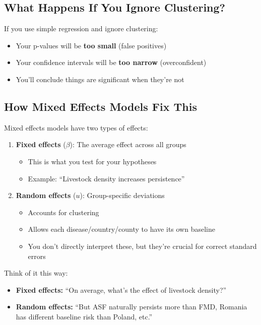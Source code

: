 \documentclass[11pt,a4paper]{article}
\begin{document}
\subsection{What Happens If You Ignore Clustering?}

\begin{warning}
If you use simple regression and ignore clustering:
\begin{itemize}
    \item Your p-values will be \textbf{too small} (false positives)
    \item Your confidence intervals will be \textbf{too narrow} (overconfident)
    \item You'll conclude things are significant when they're not
  
\end{itemize}
\end{warning}

\subsection{How Mixed Effects Models Fix This}

Mixed effects models have two types of effects:

\begin{enumerate}
    \item \textbf{Fixed effects} ($\beta$): The average effect across all groups
        \begin{itemize}
            \item This is what you test for your hypotheses
            \item Example: ``Livestock density increases persistence''
        \end{itemize}
    
    \item \textbf{Random effects} ($u$): Group-specific deviations
        \begin{itemize}
            \item Accounts for clustering
            \item Allows each disease/country/county to have its own baseline
            \item You don't directly interpret these, but they're crucial for correct standard errors
        \end{itemize}
\end{enumerate}

\begin{keypoint}
Think of it this way:
\begin{itemize}
    \item \textbf{Fixed effects:} ``On average, what's the effect of livestock density?''
    \item \textbf{Random effects:} ``But ASF naturally persists more than FMD, Romania has different baseline risk than Poland, etc.''
\end{itemize}
\end{keypoint}
\end{document}
